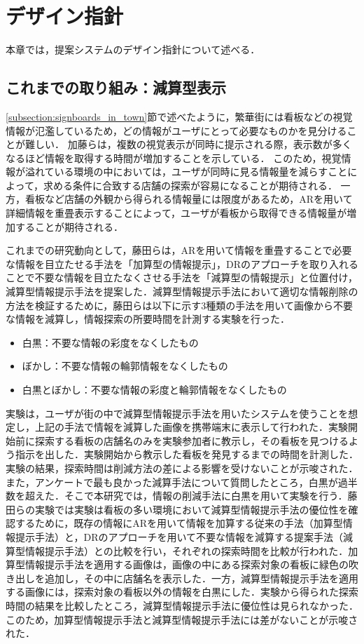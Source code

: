 \chapter{デザイン指針}
\label{chapter:design_guidline}
本章では，提案システムのデザイン指針について述べる．


\section{これまでの取り組み：減算型表示}
\label{section:dr_method}
  \ref{subsection:signboards_in_town}節で述べたように，繁華街には看板などの視覚情報が氾濫しているため，どの情報がユーザにとって必要なものかを見分けることが難しい．
  加藤らは，複数の視覚表示が同時に提示される際，表示数が多くなるほど情報を取得する時間が増加することを示している\cite{Kato:2008}．
  このため，視覚情報が溢れている環境の中においては，ユーザが同時に見る情報量を減らすことによって，求める条件に合致する店舗の探索が容易になることが期待される．
  一方，看板など店舗の外観から得られる情報量には限度があるため，ARを用いて詳細情報を重畳表示することによって，ユーザが看板から取得できる情報量が増加することが期待される．

  これまでの研究動向として，藤田らは，ARを用いて情報を重畳することで必要な情報を目立たせる手法を「加算型の情報提示」，DRのアプローチを取り入れることで不要な情報を目立たなくさせる手法を「減算型の情報提示」と位置付け，減算型情報提示手法を提案した\cite{Fujita:2013}．減算型情報提示手法において適切な情報削除の方法を検証するために，藤田らは以下に示す3種類の手法を用いて画像から不要な情報を減算し，情報探索の所要時間を計測する実験を行った．
  \begin{itemize}
    \item 白黒：不要な情報の彩度をなくしたもの
    \item ぼかし：不要な情報の輪郭情報をなくしたもの
    \item 白黒とぼかし：不要な情報の彩度と輪郭情報をなくしたもの
  \end{itemize}
  実験は，ユーザが街の中で減算型情報提示手法を用いたシステムを使うことを想定し，上記の手法で情報を減算した画像を携帯端末に表示して行われた．実験開始前に探索する看板の店舗名のみを実験参加者に教示し，その看板を見つけるよう指示を出した．実験開始から教示した看板を発見するまでの時間を計測した．実験の結果，探索時間は削減方法の差による影響を受けないことが示唆された．また，アンケートで最も良かった減算手法について質問したところ，白黒が過半数を超えた．そこで本研究では，情報の削減手法に白黒を用いて実験を行う．藤田らの実験では実験は看板の多い環境において減算型情報提示手法の優位性を確認するために，既存の情報にARを用いて情報を加算する従来の手法（加算型情報提示手法）と，DRのアプローチを用いて不要な情報を減算する提案手法（減算型情報提示手法）との比較を行い，それぞれの探索時間を比較が行われた．加算型情報提示手法を適用する画像は，画像の中にある探索対象の看板に緑色の吹き出しを追加し，その中に店舗名を表示した．一方，減算型情報提示手法を適用する画像には，探索対象の看板以外の情報を白黒にした．実験から得られた探索時間の結果を比較したところ，減算型情報提示手法に優位性は見られなかった．このため，加算型情報提示手法と減算型情報提示手法には差がないことが示唆された．

